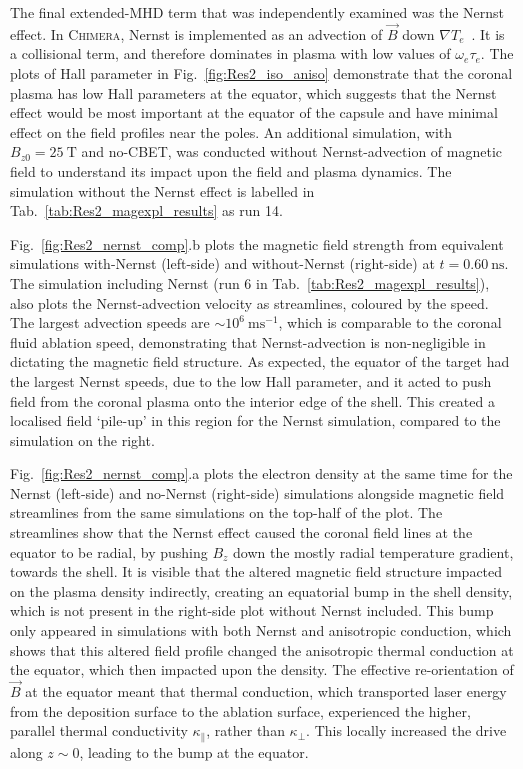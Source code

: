 The final extended-\ac{MHD} term that was independently examined was the Nernst effect.
In \textsc{Chimera}, Nernst is implemented as an advection of $\vec{B}$ down $\nabla T_e$~\cite{walsh_extendedmagnetohydrodynamics_2020}.
It is a collisional term, and therefore dominates in plasma with low values of $\omega_e\tau_e$.
The plots of Hall parameter in Fig.~\ref{fig:Res2_iso_aniso} demonstrate that the coronal plasma has low Hall parameters at the equator, which suggests that the Nernst effect would be most important at the equator of the capsule and have minimal effect on the field profiles near the poles.
An additional simulation, with $B_{z0}=25\ \text{T}$ and no-\ac{CBET}, was conducted without Nernst-advection of magnetic field to understand its impact upon the field and plasma dynamics.
The simulation without the Nernst effect is labelled in Tab.~\ref{tab:Res2_magexpl_results} as run 14.

Fig.~\ref{fig:Res2_nernst_comp}.b plots the magnetic field strength from equivalent simulations with-Nernst (left-side) and without-Nernst (right-side) at $t=0.60\ \text{ns}$.
The simulation including Nernst (run 6 in Tab.~\ref{tab:Res2_magexpl_results}), also plots the Nernst-advection velocity as streamlines, coloured by the speed.
The largest advection speeds are $\sim10^6\ \text{ms}^{-1}$, which is comparable to the coronal fluid ablation speed, demonstrating that Nernst-advection is non-negligible in dictating the magnetic field structure.
As expected, the equator of the target had the largest Nernst speeds, due to the low Hall parameter, and it acted to push field from the coronal plasma onto the interior edge of the shell.
This created a localised field `pile-up' in this region for the Nernst simulation, compared to the simulation on the right.

Fig.~\ref{fig:Res2_nernst_comp}.a plots the electron density at the same time for the Nernst (left-side) and no-Nernst (right-side) simulations alongside magnetic field streamlines from the same simulations on the top-half of the plot.
The streamlines show that the Nernst effect caused the coronal field lines at the equator to be radial, by pushing $B_z$ down the mostly radial temperature gradient, towards the shell.
It is visible that the altered magnetic field structure impacted on the plasma density indirectly, creating an equatorial bump in the shell density, which is not present in the right-side plot without Nernst included.
This bump only appeared in simulations with both Nernst and anisotropic conduction, which shows that this altered field profile changed the anisotropic thermal conduction at the equator, which then impacted upon the density.
The effective re-orientation of $\vec{B}$ at the equator meant that thermal conduction, which transported laser energy from the deposition surface to the ablation surface, experienced the higher, parallel thermal conductivity $\kappa_{\parallel}$, rather than $\kappa_{\perp}$.
This locally increased the drive along $z\sim0$, leading to the bump at the equator.

